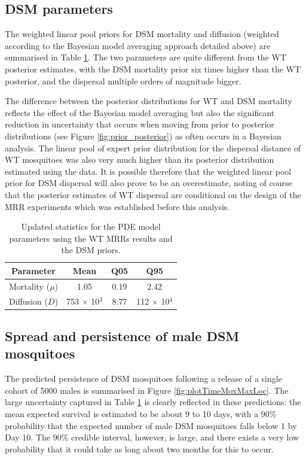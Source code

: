 \documentclass[]{bmcart}
\providecommand{\DIFaddtex}[1]{{\protect\color{blue}\uwave{#1}}} %
\providecommand{\DIFaddbegin}{} %
\providecommand{\DIFaddend}{} %
\providecommand{\DIFadd}[1]{\texorpdfstring{\DIFaddtex{#1}}{#1}} %
\newcommand{\DIFaddincludegraphics}[2][]{{\color{blue}\fbox{\DIFOincludegraphics[#1]{#2}}}} %
\DeclareRobustCommand{\DIFaddbegin}{\DIFOaddbegin \let\includegraphics\DIFaddincludegraphics} %
\DeclareRobustCommand{\DIFaddend}{\DIFOaddend \let\includegraphics\DIFOincludegraphics} %
\begin{document}
\subsection{DSM parameters}
The weighted linear pool priors for DSM mortality and diffusion (weighted according to the Bayesian model averaging approach detailed above) are summarised in Table \ref{tble:sumStatPPpostbma}. The two parameters are quite different from the WT posterior estimates, with the DSM mortality prior six times higher than the WT posterior, and the dispersal multiple orders of magnitude bigger. 

The difference between the posterior distributions for WT and DSM mortality reflects the effect of the Bayesian model averaging but also the significant reduction in uncertainty that occurs when moving from prior to posterior distributions (see Figure \ref{fig:prior_posterior}) as often occurs in a Bayesian analysis. The linear pool of expert prior distribution for the dispersal distance of WT mosquitoes was also very much higher than its posterior distribution estimated using the data. It is possible therefore that the weighted linear pool prior for DSM dispersal will also prove to be an overestimate, noting of course that the posterior estimates of WT dispersal are conditional on the design of the MRR experiments which was established before this analysis.

\begin{table}[h]
\centering
\begingroup\small
\begin{tabular}{|c|ccc|}
\hline
Parameter & Mean & Q05 & Q95  \\\hline
Mortality ($\mu$) & 1.05 & 0.19 & 2.42\\
Diffusion ($D$) & 753 $\times$ 10$^{3}$ & 8.77 & 112  $\times$ 10$^{4}$\\
\hline
\end{tabular}
\endgroup
\caption{\label{tble:sumStatPPpostbma} Updated statistics for the PDE model parameters using the WT MRRs results and the DSM priors. }
\end{table}

\subsection{Spread and persistence of male DSM mosquitoes}
The predicted persistence of DSM mosquitoes following a release of a single cohort of 5000 males is summarised in Figure \ref{fig:plotTimeMoxMaxLoc}. The large uncertainty captured in Table \ref{tble:sumStatPPpostbma} is clearly reflected in these predictions: the mean expected survival is estimated to be about 9 to 10 days, with a 90\% probability that the expected number of male DSM mosquitoes falls below 1 by Day 10. The 90\% credible interval, however, is large, and there exists a very low probability \DIFaddbegin \DIFadd{($\sim 0.05$) }\DIFaddend that it could take as long about two months for this to occur.
\end{document}
